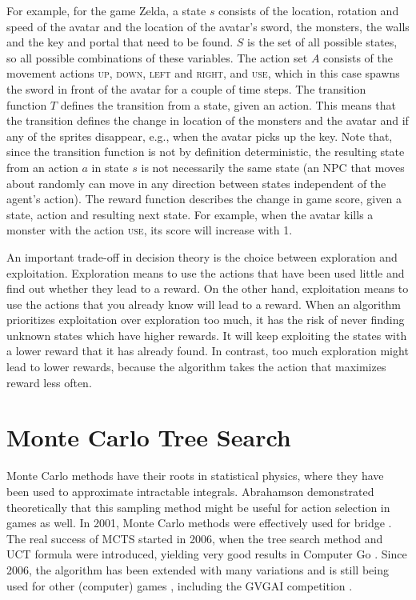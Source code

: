 For example, for the game Zelda, a state $s$ consists of the location, rotation
and speed of the avatar and the location of the avatar's sword, the monsters, the
walls and the key and portal that need to be found. $S$ is the set of all
possible states, so all possible combinations of these variables. The action set
$A$ consists of the movement actions \textsc{up}, \textsc{down}, \textsc{left}
and \textsc{right}, and \textsc{use}, which in this case spawns the sword in
front of the avatar for a couple of time steps. The transition function $T$
defines the transition from a state, given an action.  This means that the
transition defines the change in location of the monsters and the avatar and if
any of the sprites disappear, e.g., when the avatar picks up the key. Note that,
since the transition function is not by definition deterministic, the resulting
state from an action $a$ in state $s$ is not necessarily the same state
(an NPC that moves about randomly can move in any direction between
states independent of the agent's action). The reward function describes the
change in game score, given a state, action and resulting next state. For
example, when the avatar kills a monster with the action \textsc{use}, its score
will increase with 1.

An important trade-off in decision theory is the choice between exploration and
exploitation. Exploration means to use the actions that have been used little
and find out whether they lead to a reward. On the other hand, exploitation
means to use the actions that you already know will lead to a reward. When an
algorithm prioritizes exploitation over exploration too much, it has the risk of
never finding unknown states which have higher rewards. It will keep exploiting
the states with a lower reward that it has already found. In contrast, too much
exploration might lead to lower rewards, because the algorithm takes the action
that maximizes reward less often.

\section{Monte Carlo Tree Search}
\label{subsec:mcts}
Monte Carlo methods have their roots in statistical physics, where they have
been used to approximate intractable integrals. Abrahamson
\cite{abramson1990expected} demonstrated theoretically that this sampling method
might be useful for action selection in games as well.  In 2001, Monte Carlo
methods were effectively used for bridge \cite{ginsberg2001gib}. The real
success of MCTS started in 2006, when the tree search method and UCT formula
were introduced, yielding very good results in Computer Go
\cite{gelly2006modification}. Since 2006, the algorithm has been extended with
many variations and is still being used for other (computer) games
\cite{browne2012survey}, including the GVGAI competition
\cite{perez2014knowledge}.

